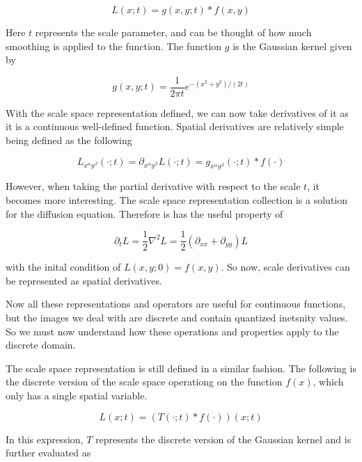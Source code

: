 \documentclass{article}
\begin{document}
\begin{equation}
  L(x;t) = g(x,y;t) * f(x,y)
\end{equation}

Here $t$ represents the scale parameter, and can be thought of how much smoothing is applied to the function. The function $g$ is the Gaussian kernel given by

\begin{equation}
  g(x,y;t) = \frac{1}{2 \pi t}e^{-(x^2+y^2)/(2t)}
\end{equation}

With the scale space representation defined, we can now take derivatives of it as it is a continuous well-defined function.
Spatial derivatives are relatively simple being defined as the following

\begin{equation}
  L_{x^{\alpha}y^{\beta}}(\cdot;t) = \partial_{x^{\alpha}y^{\beta}}L(\cdot;t) = g_{x^{\alpha}y^{\beta}}(\cdot;t) * f(\cdot)
\end{equation}

However, when taking the partial derivative with respect to the scale $t$, it becomes more interesting.
The scale space representation collection is a solution for the diffusion equation. Therefore is has the useful property of 

\begin{equation}
  \partial_t L = \frac{1}{2} \nabla^2 L = \frac{1}{2} (\partial_{xx} + \partial_{yy})L
\end{equation}

with the inital condition of $L(x,y;0) = f(x,y)$.
So now, scale derivatives can be represented as spatial derivatives. 

Now all these representations and operators are useful for continuous functions, but the images we deal with are discrete and contain quantized inetsnity values.
So we must now understand how these operations and properties apply to the discrete domain.

The scale space representation is still defined in a similar fashion.
The following is the discrete version of the scale space operationg on the function $f(x)$, which only has a single spatial variable.

\begin{equation}
  L(x;t) = (T(\cdot;t) * f(\cdot))(x;t)
\end{equation}

In this expression, $T$ represents the discrete version of the Gaussian kernel and is further evaluated as
\end{document}
